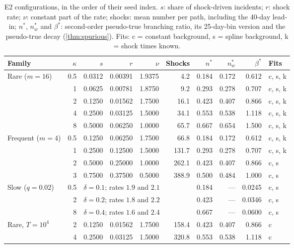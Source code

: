 \begin{table}[t]
\centering
\caption{E2 configurations, in the order of their seed index. $s$: share of shock-driven
incidents; $r$: shock rate; $\nu$: constant part of the rate; shocks: mean number per path,
including the 40-day lead-in; $n^*$, $n^*_w$ and $\beta^*$: second-order pseudo-true
branching ratio, its 25-day-bin version and the pseudo-true decay
(\cref{thm:spurious}). Fits: c = constant background, s = spline background,
k = shock times known.}
\label{tab:sim-e2}
\small
\begin{tabular}{@{}lrrrrrrrrl@{}}
\toprule
Family & $\kappa$ & $s$ & $r$ & $\nu$ & Shocks & $n^*$ & $n^*_w$ & $\beta^*$ & Fits\\
\midrule
Rare ($m=16$) & 0.5 & 0.0312 & 0.00391 & 1.9375 & 4.2 & 0.184 & 0.172 & 0.612 & c, s, k\\
 & 1 & 0.0625 & 0.00781 & 1.8750 & 9.2 & 0.293 & 0.278 & 0.707 & c, s, k\\
 & 2 & 0.1250 & 0.01562 & 1.7500 & 16.1 & 0.423 & 0.407 & 0.866 & c, s, k\\
 & 4 & 0.2500 & 0.03125 & 1.5000 & 34.1 & 0.553 & 0.538 & 1.118 & c, s, k\\
 & 8 & 0.5000 & 0.06250 & 1.0000 & 65.7 & 0.667 & 0.654 & 1.500 & c, s, k\\
\addlinespace
Frequent ($m=4$) & 0.5 & 0.1250 & 0.06250 & 1.7500 & 66.8 & 0.184 & 0.172 & 0.612 & c, s, k\\
 & 1 & 0.2500 & 0.12500 & 1.5000 & 131.7 & 0.293 & 0.278 & 0.707 & c, s, k\\
 & 2 & 0.5000 & 0.25000 & 1.0000 & 262.1 & 0.423 & 0.407 & 0.866 & c, s\\
 & 3 & 0.7500 & 0.37500 & 0.5000 & 388.9 & 0.500 & 0.484 & 1.000 & c, s\\
\addlinespace
Slow ($q=0.02$) & 0.5 & \multicolumn{4}{l}{$\delta=0.1$; rates $1.9$ and $2.1$} & 0.184 & --- & 0.0245 & c, s\\
 & 2 & \multicolumn{4}{l}{$\delta=0.2$; rates $1.8$ and $2.2$} & 0.423 & --- & 0.0346 & c, s\\
 & 8 & \multicolumn{4}{l}{$\delta=0.4$; rates $1.6$ and $2.4$} & 0.667 & --- & 0.0600 & c, s\\
\addlinespace
Rare, $T=10^4$ & 2 & 0.1250 & 0.01562 & 1.7500 & 158.4 & 0.423 & 0.407 & 0.866 & c\\
 & 4 & 0.2500 & 0.03125 & 1.5000 & 320.8 & 0.553 & 0.538 & 1.118 & c\\
\bottomrule
\end{tabular}
\end{table}

